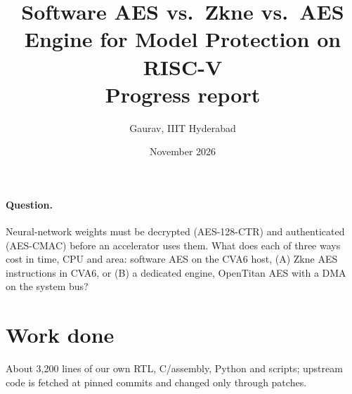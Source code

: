 \documentclass[10pt]{article}
\title{Software AES vs.\ Zkne vs.\ AES Engine for Model Protection on RISC-V\\\large Progress report}
\author{Gaurav, IIIT Hyderabad}
\date{November 2026}
\begin{document}
\maketitle
\vspace{-6mm}

\paragraph{Question.} Neural-network weights must be decrypted (AES-128-CTR) and authenticated (AES-CMAC) before an
accelerator uses them. What does each of three ways cost in time, CPU and area: software AES on the CVA6 host,
(A) Zkne AES instructions in CVA6, or (B) a dedicated engine, OpenTitan AES with a DMA on the system bus?

\section*{Work done}
About 3{,}200 lines of our own RTL, C/assembly, Python and scripts; upstream code is fetched at pinned commits and changed only through patches.
\end{document}
